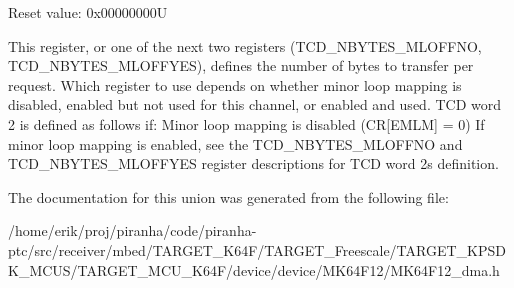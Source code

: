Reset value\+: 0x00000000U

This register, or one of the next two registers (T\+C\+D\+\_\+\+N\+B\+Y\+T\+E\+S\+\_\+\+M\+L\+O\+F\+F\+NO, T\+C\+D\+\_\+\+N\+B\+Y\+T\+E\+S\+\_\+\+M\+L\+O\+F\+F\+Y\+ES), defines the number of bytes to transfer per request. Which register to use depends on whether minor loop mapping is disabled, enabled but not used for this channel, or enabled and used. T\+CD word 2 is defined as follows if\+: Minor loop mapping is disabled (CR\mbox{[}E\+M\+LM\mbox{]} = 0) If minor loop mapping is enabled, see the T\+C\+D\+\_\+\+N\+B\+Y\+T\+E\+S\+\_\+\+M\+L\+O\+F\+F\+NO and T\+C\+D\+\_\+\+N\+B\+Y\+T\+E\+S\+\_\+\+M\+L\+O\+F\+F\+Y\+ES register descriptions for T\+CD word 2\textquotesingle{}s definition. 

The documentation for this union was generated from the following file\+:\begin{DoxyCompactItemize}
\item 
/home/erik/proj/piranha/code/piranha-\/ptc/src/receiver/mbed/\+T\+A\+R\+G\+E\+T\+\_\+\+K64\+F/\+T\+A\+R\+G\+E\+T\+\_\+\+Freescale/\+T\+A\+R\+G\+E\+T\+\_\+\+K\+P\+S\+D\+K\+\_\+\+M\+C\+U\+S/\+T\+A\+R\+G\+E\+T\+\_\+\+M\+C\+U\+\_\+\+K64\+F/device/device/\+M\+K64\+F12/M\+K64\+F12\+\_\+dma.\+h\end{DoxyCompactItemize}
